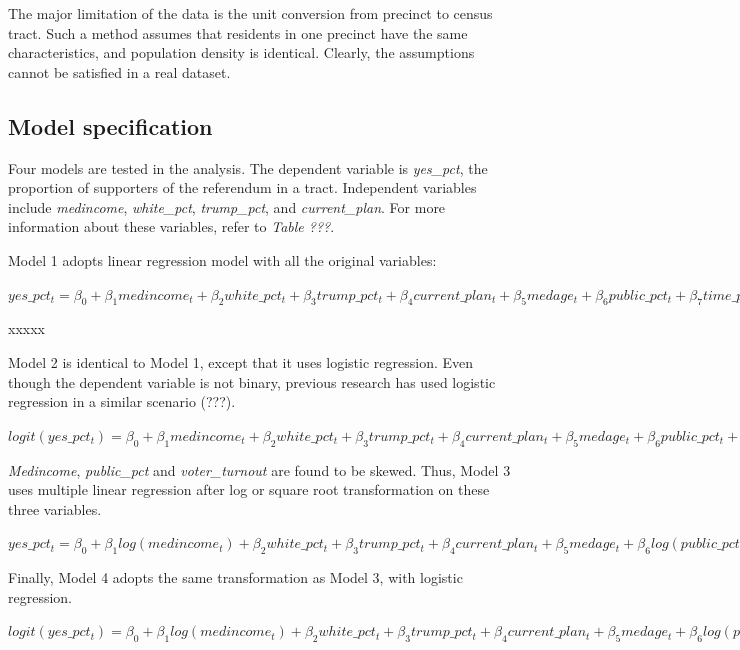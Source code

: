 \documentclass[
]{article}
\begin{document}
The major limitation of the data is the unit conversion from precinct to
census tract. Such a method assumes that residents in one precinct have
the same characteristics, and population density is identical. Clearly,
the assumptions cannot be satisfied in a real dataset.

\hypertarget{model-specification}{%
\subsection{Model specification}\label{model-specification}}

Four models are tested in the analysis. The dependent variable is
\emph{yes\_pct}, the proportion of supporters of the referendum in a
tract. Independent variables include \emph{medincome},
\emph{white\_pct}, \emph{trump\_pct}, and \emph{current\_plan}. For more
information about these variables, refer to \emph{Table ???}.

Model 1 adopts linear regression model with all the original variables:

\(yes\_pct_t = \beta_0+\beta_1medincome_t+\beta_2white\_pct_t+\beta_3trump\_pct_t+\beta_4current\_plan_t+\beta_5medage_t+\beta_6public\_pct_t+\beta_7time\_pct_t+\beta_8voter\_turnout_t+\epsilon_t\)

xxxxx

Model 2 is identical to Model 1, except that it uses logistic
regression. Even though the dependent variable is not binary, previous
research has used logistic regression in a similar scenario (???).

\(logit(yes\_pct_t) = \beta_0+\beta_1medincome_t+\beta_2white\_pct_t+\beta_3trump\_pct_t+\beta_4current\_plan_t+\beta_5medage_t+\beta_6public\_pct_t+\beta_7time\_pct_t+\beta_8voter\_turnout_t+\epsilon_4\)

\emph{Medincome}, \emph{public\_pct} and \emph{voter\_turnout} are found
to be skewed. Thus, Model 3 uses multiple linear regression after log or
square root transformation on these three variables.

\(yes\_pct_t = \beta_0+\beta_1log(medincome_t)+\beta_2white\_pct_t+\beta_3trump\_pct_t+\beta_4current\_plan_t+\beta_5medage_t+\beta_6log(public\_pct_t + 0,01)+\beta_7time\_pct_t+\beta_8\sqrt{voter\_turnout_t}+\epsilon_t\)

Finally, Model 4 adopts the same transformation as Model 3, with
logistic regression.

\(logit(yes\_pct_t) = \beta_0+\beta_1log(medincome_t)+\beta_2white\_pct_t+\beta_3trump\_pct_t+\beta_4current\_plan_t+\beta_5medage_t+\beta_6log(public\_pct_t + 0.01)+\beta_7time\_pct_t+\beta_8\sqrt{voter\_turnout_t}+\epsilon_t\)
\end{document}

